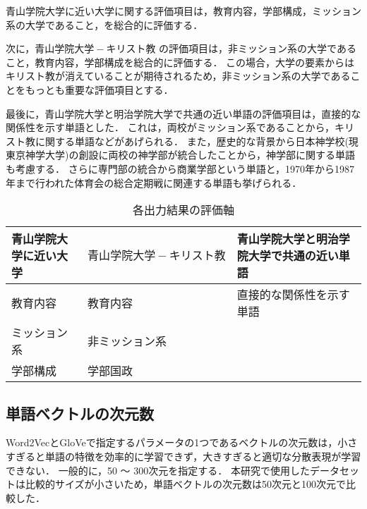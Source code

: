 青山学院大学に近い大学に関する評価項目は，教育内容，学部構成，ミッション系の大学であること，を総合的に評価する．

次に，$ 青山学院大学 - キリスト教 $ の評価項目は，非ミッション系の大学であること，教育内容，学部構成を総合的に評価する．
この場合，大学の要素からはキリスト教が消えていることが期待されるため，非ミッション系の大学であることをもっとも重要な評価項目とする．

最後に，青山学院大学と明治学院大学で共通の近い単語の評価項目は，直接的な関係性を示す単語とした．
これは，両校がミッション系であることから，キリスト教に関する単語などがあげられる．
また，歴史的な背景から日本神学校(現 東京神学大学)の創設に両校の神学部が統合したことから，神学部に関する単語も考慮する．
さらに専門部の統合から商業学部という単語と，1970年から1987年まで行われた体育会の総合定期戦に関連する単語も挙げられる．

\begin{table}[htbp]
\caption{各出力結果の評価軸}
\centering
\begin{tabular}{|l|l|l|}
\hline
青山学院大学に近い大学 & $ 青山学院大学 - キリスト教 $ & 青山学院大学と明治学院大学で共通の近い単語
\\ \hline \hline
教育内容& 教育内容 & 直接的な関係性を示す単語 \\
ミッション系& 非ミッション系 & \\
学部構成 & 学部国政 & \\ \hline
\end{tabular}
\label{table:eval}
\end{table}


\subsection{単語ベクトルの次元数}
Word2VecとGloVeで指定するパラメータの1つであるベクトルの次元数は，小さすぎると単語の特徴を効率的に学習できず，大きすぎると適切な分散表現が学習できない．
一般的に，50 〜 300次元を指定する．
本研究で使用したデータセットは比較的サイズが小さいため，単語ベクトルの次元数は50次元と100次元で比較した．

